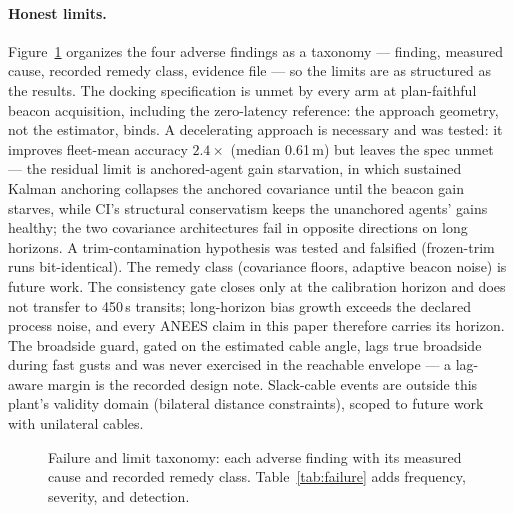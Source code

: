 \documentclass[letterpaper, 10pt, journal]{IEEEtran}
\begin{document}
\paragraph{Honest limits.} Figure~\ref{fig:taxonomy} organizes the four
adverse findings as a taxonomy --- finding, measured cause, recorded remedy
class, evidence file --- so the limits are as structured as the results.
The docking specification is unmet by every arm at
plan-faithful beacon acquisition, including the zero-latency reference: the
approach geometry, not the estimator, binds. A decelerating approach is
necessary and was tested: it improves fleet-mean accuracy $2.4\times$ (median
0.61\,m) but leaves the spec unmet --- the residual limit is anchored-agent
gain starvation, in which sustained Kalman anchoring collapses the anchored
covariance until the beacon gain starves, while CI's structural conservatism
keeps the unanchored agents' gains healthy; the two covariance architectures
fail in opposite directions on long horizons. A trim-contamination hypothesis
was tested and falsified (frozen-trim runs bit-identical). The remedy class
(covariance floors, adaptive beacon noise) is future work. The consistency
gate closes only at the calibration horizon and does not transfer to 450\,s
transits; long-horizon bias growth exceeds the declared process noise, and
every ANEES claim in this paper therefore carries its horizon. The broadside
guard, gated on the estimated cable angle, lags true broadside during fast
gusts and was never exercised in the reachable envelope --- a lag-aware margin
is the recorded design note. Slack-cable events are outside this plant's
validity domain (bilateral distance constraints), scoped to future work with
unilateral cables.

\begin{figure}[t]
  \centering
  
  \caption{Failure and limit taxonomy: each adverse finding with its
  measured cause and recorded remedy class.
  Table~\ref{tab:failure} adds frequency, severity, and detection.}
  \label{fig:taxonomy}
\end{figure}
\end{document}
